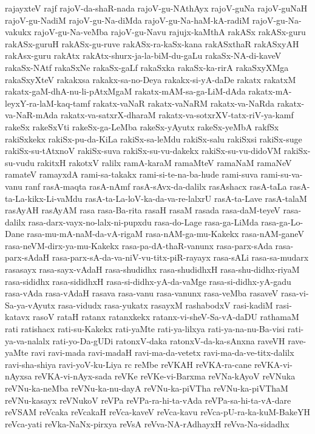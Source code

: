 {rajayxteV
rajf
rajoV-da-shaR-nada
rajoV-gu-NAthAyx
rajoV-guNa
rajoV-guNaH
rajoV-gu-NadiM
rajoV-gu-Na-diMda
rajoV-gu-Na-haM-kA-radiM
rajoV-gu-Na-vakukx
rajoV-gu-Na-veMba
rajoV-gu-Navu
rajujx-kaMthA
rakASx
rakASx-guru
rakASx-guruH
rakASx-gu-ruve
rakASx-ra-kaSx-kana
rakASxthaR
rakASxyAH
rakAsx-guru
rakAtx
rakAtx-shurx-ja-la-biM-du-gaLu
rakaSx-NA-di-kaveV
rakaSx-NAtf
rakaSxNe
rakaSx-gaLf
rakaSxka
rakaSx-ka-rirA
rakaSxyXMga
rakaSxyXteV
rakakxsa
rakakx-sa-no-Deya
rakakx-si-yA-daDe
rakatx
rakatxM
rakatx-gaM-dhA-nu-li-pAtxMgaM
rakatx-mAM-sa-ga-LiM-dAda
rakatx-mA-leyxY-ra-laM-kaq-tamf
rakatx-vaNaR
rakatx-vaNaRM
rakatx-va-NaRda
rakatx-va-NaR-mAda
rakatx-va-satxrX-dharaM
rakatx-va-sotxrXV-tatx-riV-ya-kamf
rakeSx
rakeSxVti
rakeSx-ga-LeMba
rakeSx-yAyutx
rakeSx-yeMbA
rakfSx
rakiSxkekx
rakiSx-pu-da-KiLa
rakiSx-sa-leMdu
rakiSx-salu
rakiSxsi
rakiSx-suge
rakiSx-su-tAtxnoV
rakiSx-suva
rakiSx-su-vu-dakekx
rakiSx-su-vu-didoVM
rakiSx-su-vudu
rakitxH
rakotxV
ralilx
ramA-karaM
ramaMteV
ramaNaM
ramaNeV
ramateV
ramayxdA
rami-sa-takakx
rami-si-te-na-ba-hude
rami-suva
rami-su-va-vanu
ranf
rasA-maqta
rasA-nAmf
rasA-sAvx-da-dalilx
rasAshacx
rasA-taLa
rasA-ta-La-kikx-Li-vaMdu
rasA-ta-La-loV-ka-da-va-re-lalxrU
rasA-ta-Lave
rasA-talaM
rasAyAH
rasAyAM
rasa
rasa-Ba-rita
rasaH
rasaM
rasada
rasa-daM-teyeV
rasa-dalilx
rasa-darx-vayx-no-lalx-ni-pupxdu
rasa-do-Lage
rasa-ga-LiMda
rasa-ga-Lo-Dane
rasa-mu-mA-naM-da-vA-rigaM
rasa-nAM-ga-mu-Kakekx
rasa-nAM-ganeV
rasa-neVM-dirx-ya-mu-Kakekx
rasa-pa-dA-thaR-vanunx
rasa-parx-sAda
rasa-parx-sAdaH
rasa-parx-sA-da-va-niV-vu-titx-piR-rayayx
rasa-sALi
rasa-sa-mudarx
rasasayx
rasa-sayx-vAdaH
rasa-shudidhx
rasa-shudidhxH
rasa-shu-didhx-riyaM
rasa-sididhx
rasa-sididhxH
rasa-si-didhx-yA-da-vaMge
rasa-si-didhx-yA-gadu
rasa-vAda
rasa-vAdaH
rasava
rasa-vanu
rasa-vanunx
rasa-veMba
rasaveV
rasa-vi-Sa-ya-vAyutx
rasa-vidudx
rasa-yukatx
rasayxM
rashabodxV
rasi-kadiM
rasi-katavx
rasoV
rataH
ratanx
ratanxkekx
ratanx-vi-sheV-Sa-vA-daDU
rathamaM
rati
ratishacx
rati-su-Kakekx
rati-yaMte
rati-ya-lilxya
rati-ya-na-nu-Ba-visi
rati-ya-va-nalalx
rati-yo-Da-gUDi
ratonxV-daka
ratonxV-da-ka-sAnxna
raveVH
rave-yaMte
ravi
ravi-mada
ravi-madaH
ravi-ma-da-vetetx
ravi-ma-da-ve-titx-dalilx
ravi-sha-shiya
ravi-yoV-ku-Liya
rc
reMbe
reVKAH
reVKA-ra-cane
reVKA-vi-nAyxsa
reVKA-vi-nAyx-sada
reVKe
reVKe-vi-Barxma
reVNa-kAyoV
reVNuka
reVNu-ka-neMba
reVNu-ka-nu-dayA
reVNu-ka-piVTha
reVNu-ka-piVThaM
reVNu-kasayx
reVNukoV
reVPa
reVPa-ra-hi-ta-vAda
reVPa-sa-hi-ta-vA-dare
reVSAM
reVcaka
reVcakaH
reVca-kaveV
reVca-kavu
reVca-pU-ra-ka-kuM-BakeYH
reVca-yati
reVka-NaNx-pirxya
reVsA
reVva-NA-rAdhayxH
reVva-Na-sidadhx
}
